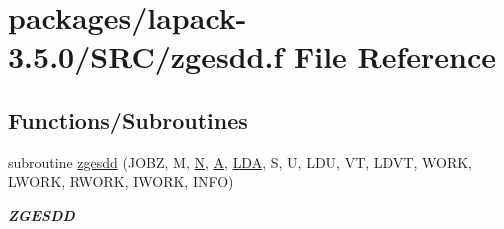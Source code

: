 \hypertarget{zgesdd_8f}{}\section{packages/lapack-\/3.5.0/\+S\+R\+C/zgesdd.f File Reference}
\label{zgesdd_8f}
\subsection*{Functions/\+Subroutines}
\begin{DoxyCompactItemize}
\item 
subroutine \hyperlink{group__complex16GEsing_gaccb06ed106ce18814ad7069dcb43aa27}{zgesdd} (J\+O\+B\+Z, M, \hyperlink{polmisc_8c_a0240ac851181b84ac374872dc5434ee4}{N}, \hyperlink{classA}{A}, \hyperlink{example__user_8c_ae946da542ce0db94dced19b2ecefd1aa}{L\+D\+A}, S, U, L\+D\+U, V\+T, L\+D\+V\+T, W\+O\+R\+K, L\+W\+O\+R\+K, R\+W\+O\+R\+K, I\+W\+O\+R\+K, I\+N\+F\+O)
\begin{DoxyCompactList}\small\item\em {\bfseries Z\+G\+E\+S\+D\+D} \end{DoxyCompactList}\end{DoxyCompactItemize}
